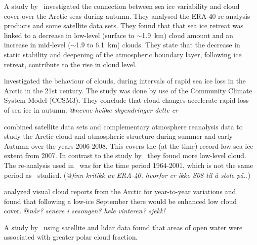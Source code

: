 A study by~\citet{Schweiger2008} investigated the connection between sea ice variability and cloud cover over the Arctic seas during autumn. They analysed the ERA-40 re-analysis products and some satellite data sets. %
They found that that sea ice retreat was linked to a decrease in low-level (surface to $\sim$1.9~km) cloud amount and an increase in mid-level ($\sim$1.9 to 6.1~km) clouds. They state that the decrease in static stability and deepening of the atmospheric boundary layer, following ice retreat, contribute to the rise in cloud level. 

\citet{Vavrus2010} investigated the behaviour of clouds, during intervals of rapid sea ice loss in the Arctic in the 21st century. The study was done by use of the Community Climate System Model (CCSM3). They conclude that cloud changes accelerate rapid loss of sea ice in autumn. @\textit{nevne hvilke skyendringer dette er} %

\citet{Kay2009} combined satellite data sets and complementary atmosphere reanalysis data to study the Arctic cloud and atmospheric structure during summer and early Autumn over the years 2006-2008. This covers the (at the time) record low sea ice extent from 2007. In contrast to the study by~\citet{Schweiger2008} they found more low-level cloud. The re-analysis used in~\citet{Schweiger2008} was for the time period 1964-2001, which is not the same period as~\citet{Kay2009} studied. (@\textit{finn kritikk av ERA-40, hvorfor er ikke S08 til å stole på..})

\citet{Eastman2010a} analyzed visual cloud reports from the Arctic for year-to-year variations and found that following a low-ice September there would be enhanced low cloud cover. @\textit{når? senere i sesongen? hele vinteren? sjekk!}

A study by~\citet{Palm2010} using satellite and lidar data  found that areas of open water were associated with greater polar cloud fraction. %

